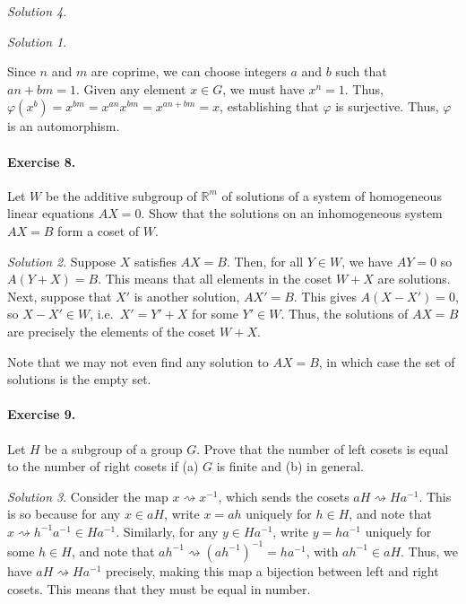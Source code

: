 \documentclass[11pt]{report}
\def\R{\mathbb{R}}
\theoremstyle{remark}
\newtheorem*{solution}{Solution}
\begin{document}
\begin{solution}
\begin{solution}
\begin{enumerate}
        Since $n$ and $m$ are coprime, we can choose integers $a$ and $b$ such that
        $an + bm = 1$. Given any element $x \in G$, we must have $x^n = 1$.
        Thus, $\varphi(x^b) = x^{bm} = x^{an}x^{bm} = x^{an + bm} = x$, establishing
        that $\varphi$ is surjective. Thus, $\varphi$ is an automorphism.
        \end{enumerate}
    \end{solution}

    \paragraph{Exercise 8.} Let $W$ be the additive subgroup of $\R^m$ of solutions
    of a system of homogeneous linear equations $AX = 0$. Show that the solutions on
    an inhomogeneous system $AX = B$ form a coset of $W$.
    \begin{solution}
        Suppose $X$ satisfies $AX = B$. Then, for all $Y \in W$, we have $AY = 0$ so
        $A(Y + X) = B$. This means that all elements in the coset $W + X$ are
        solutions. Next, suppose that $X'$ is another solution, $AX' = B$. This
        gives $A(X - X') = 0$, so $X - X' \in W$, i.e.\ $X' = Y' + X$ for some $Y'
        \in W$. Thus, the solutions of $AX = B$ are precisely the elements of the
        coset $W + X$.

        Note that we may not even find any solution to $AX = B$, in which case the
        set of solutions is the empty set.
    \end{solution}
    
    \paragraph{Exercise 9.} Let $H$ be a subgroup of a group $G$. Prove that the
    number of left cosets is equal to the number of right cosets if (a) $G$ is
    finite and (b) in general.
    \begin{solution}
        Consider the map $x \rightsquigarrow x^{-1}$, which sends the cosets $aH
        \rightsquigarrow Ha^{-1}$. This is so because for any $x \in aH$,
        write $x = ah$ uniquely for $h \in H$, and note that $x \rightsquigarrow h^{-1}a^{-1}
        \in Ha^{-1}$. Similarly, for any $y \in Ha^{-1}$, write $y = ha^{-1}$
        uniquely for some $h \in H$, and note that $ah^{-1} \rightsquigarrow
        (ah^{-1})^{-1} = ha^{-1}$, with $ah^{-1} \in aH$. Thus, we have $aH
        \rightsquigarrow Ha^{-1}$ precisely, making this map a bijection between
        left and right cosets. This means that they must be equal in number.
    \end{solution}
    

\end{solution}
\end{document}

